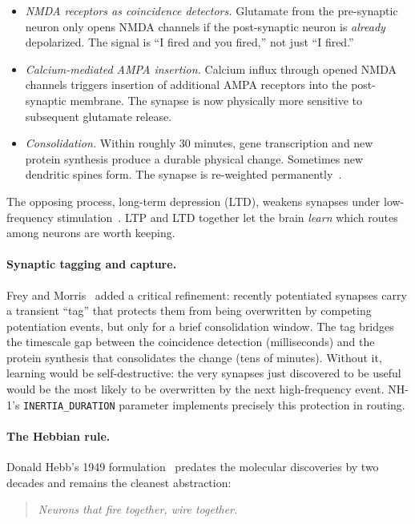 \documentclass[conference]{IEEEtran}
\newcommand{\nhone}{NH-1\xspace}
\begin{document}
\begin{itemize}
\item \emph{NMDA receptors as coincidence detectors.} Glutamate from the
pre-synaptic neuron only opens NMDA channels if the post-synaptic
neuron is \emph{already} depolarized. The signal is ``I fired and you
fired,'' not just ``I fired.''
\item \emph{Calcium-mediated AMPA insertion.} Calcium influx through
opened NMDA channels triggers insertion of additional AMPA receptors
into the post-synaptic membrane. The synapse is now physically more
sensitive to subsequent glutamate release.
\item \emph{Consolidation.} Within roughly $30$ minutes, gene
transcription and new protein synthesis produce a durable physical
change. Sometimes new dendritic spines form. The synapse is
re-weighted permanently~\cite{bear2020neuroscience}.
\end{itemize}

\noindent
The opposing process, long-term depression (LTD), weakens synapses
under low-frequency stimulation~\cite{stanton1989associative}. LTP and
LTD together let the brain \emph{learn} which routes among neurons are
worth keeping.

\paragraph{Synaptic tagging and capture.}
Frey and Morris~\cite{frey1997synaptic} added a critical refinement:
recently potentiated synapses carry a transient ``tag'' that protects
them from being overwritten by competing potentiation events, but only
for a brief consolidation window. The tag bridges the timescale gap
between the coincidence detection (milliseconds) and the protein
synthesis that consolidates the change (tens of minutes). Without it,
learning would be self-destructive: the very synapses just discovered
to be useful would be the most likely to be overwritten by the next
high-frequency event. \nhone's \texttt{INERTIA\_DURATION} parameter
implements precisely this protection in routing.

\paragraph{The Hebbian rule.}
Donald Hebb's 1949 formulation~\cite{hebb1949organization} predates
the molecular discoveries by two decades and remains the cleanest
abstraction:

\begin{quote}
\emph{Neurons that fire together, wire together.}
\end{quote}
\end{document}
